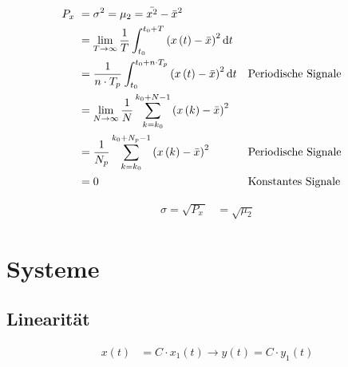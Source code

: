 \begin{boxleft}
\\
\\
\end{boxleft}\begin{boxrightshaded}
\begin{align*}
P_{x~}&=\sigma^2=\mu_2=\bar{x^2}-\bar{x}^2\\
&=\lim_{T\to\infty}\frac{1}{T}\int_{t_0}^{t_0+T}\left(x\left(t\right)-\bar{x}\right)^2\mathop{}\!\mathrm{d} t\\
&=\frac{1}{n\cdot T_p}\int_{t_0}^{t_0+n\cdot T_p}\left(x\left(t\right)-\bar{x}\right)^2\mathop{}\!\mathrm{d} t&&\text{Periodische Signale}\\
&=\lim_{N\to\infty}\frac{1}{N}\sum_{k=k_0}^{k_0+N-1}\left(x\left(k\right)-\bar{x}\right)^2\\
&=\frac{1}{N_p}\sum_{k=k_0}^{k_0+N_p-1}\left(x\left(k\right)-\bar{x}\right)^2&&\text{Periodische Signale}\\
&=0&&\text{Konstantes Signale}
\end{align*}
\end{boxrightshaded}

\begin{boxleft}
\end{boxleft}\begin{boxrightshaded}
\begin{align*}
\sigma=\sqrt{P_{x~}}&=\sqrt{\mu_2}
\end{align*}
\end{boxrightshaded}


\section{Systeme}

\subsection{Linearität}

\begin{boxleft}
\end{boxleft}\begin{boxrightshaded}
\begin{align*}
x\left(t\right)&=C\cdot x_1\left(t\right)\to y\left(t\right)=C\cdot y_1\left(t\right)
\end{align*}
\end{boxrightshaded}

